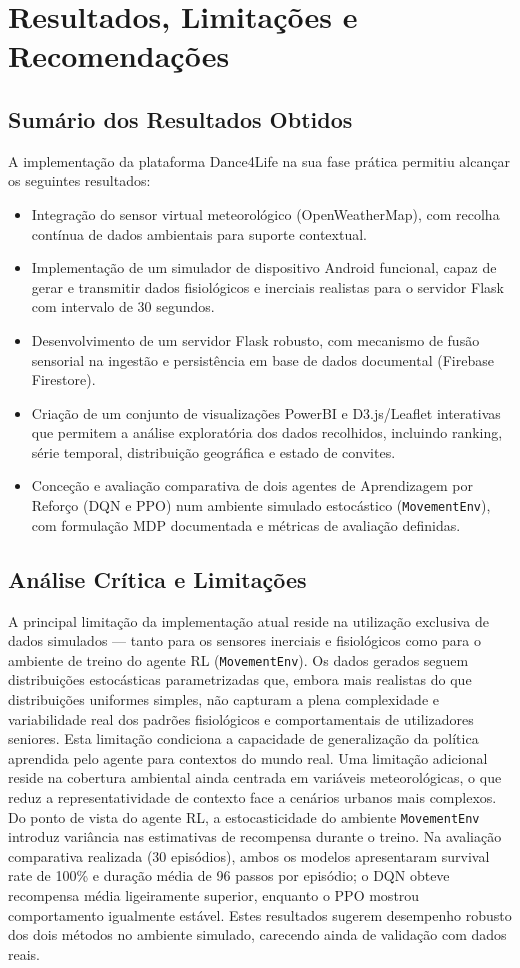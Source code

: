 \documentclass[runningheads]{llncs}
\begin{document}
\section{Resultados, Limitações e Recomendações}
\subsection{Sumário dos Resultados Obtidos}
A implementação da plataforma Dance4Life na sua fase prática permitiu alcançar os seguintes resultados:

\begin{itemize}
\item Integração do sensor virtual meteorológico (OpenWeatherMap), com recolha contínua de dados ambientais para suporte contextual.
\item Implementação de um simulador de dispositivo Android funcional, capaz de gerar e transmitir dados fisiológicos e inerciais realistas para o servidor Flask com intervalo de 30 segundos.
\item Desenvolvimento de um servidor Flask robusto, com mecanismo de fusão sensorial na ingestão e persistência em base de dados documental (Firebase Firestore).
\item Criação de um conjunto de visualizações PowerBI e D3.js/Leaflet interativas que permitem a análise exploratória dos dados recolhidos, incluindo ranking, série temporal, distribuição geográfica e estado de convites.
\item Conceção e avaliação comparativa de dois agentes de Aprendizagem por Reforço (DQN e PPO) num ambiente simulado estocástico (\texttt{MovementEnv}), com formulação MDP documentada e métricas de avaliação definidas.
\end{itemize}

\subsection{Análise Crítica e Limitações}
A principal limitação da implementação atual reside na utilização exclusiva de dados simulados — tanto para os sensores inerciais e fisiológicos como para o ambiente de treino do agente RL (\texttt{MovementEnv}). Os dados gerados seguem distribuições estocásticas parametrizadas que, embora mais realistas do que distribuições uniformes simples, não capturam a plena complexidade e variabilidade real dos padrões fisiológicos e comportamentais de utilizadores seniores. Esta limitação condiciona a capacidade de generalização da política aprendida pelo agente para contextos do mundo real.
Uma limitação adicional reside na cobertura ambiental ainda centrada em variáveis meteorológicas, o que reduz a representatividade de contexto face a cenários urbanos mais complexos. Do ponto de vista do agente RL, a estocasticidade do ambiente \texttt{MovementEnv} introduz variância nas estimativas de recompensa durante o treino. Na avaliação comparativa realizada (30 episódios), ambos os modelos apresentaram survival rate de 100\% e duração média de 96 passos por episódio; o DQN obteve recompensa média ligeiramente superior, enquanto o PPO mostrou comportamento igualmente estável. Estes resultados sugerem desempenho robusto dos dois métodos no ambiente simulado, carecendo ainda de validação com dados reais.
\end{document}

